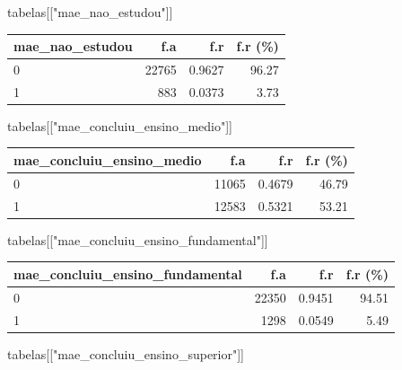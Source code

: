 \documentclass[
]{article}
\newenvironment{Shaded}{\begin{snugshade}}{\end{snugshade}}
\newcommand{\NormalTok}[1]{\textcolor[rgb]{0.00,0.23,0.31}{#1}}
\newcommand{\StringTok}[1]{\textcolor[rgb]{0.13,0.47,0.30}{#1}}
\begin{document}
\begin{Shaded}
\begin{Highlighting}[]
\NormalTok{tabelas[[}\StringTok{"mae\_nao\_estudou"}\NormalTok{]]}
\end{Highlighting}
\end{Shaded}

\begin{longtable}[]{@{}lrrr@{}}
\toprule()
mae\_nao\_estudou & f.a & f.r & f.r (\%) \\
\midrule()
\endhead
0 & 22765 & 0.9627 & 96.27 \\
1 & 883 & 0.0373 & 3.73 \\
\bottomrule()
\end{longtable}

\begin{Shaded}
\begin{Highlighting}[]
\NormalTok{tabelas[[}\StringTok{"mae\_concluiu\_ensino\_medio"}\NormalTok{]]}
\end{Highlighting}
\end{Shaded}

\begin{longtable}[]{@{}lrrr@{}}
\toprule()
mae\_concluiu\_ensino\_medio & f.a & f.r & f.r (\%) \\
\midrule()
\endhead
0 & 11065 & 0.4679 & 46.79 \\
1 & 12583 & 0.5321 & 53.21 \\
\bottomrule()
\end{longtable}

\begin{Shaded}
\begin{Highlighting}[]
\NormalTok{tabelas[[}\StringTok{"mae\_concluiu\_ensino\_fundamental"}\NormalTok{]]}
\end{Highlighting}
\end{Shaded}

\begin{longtable}[]{@{}lrrr@{}}
\toprule()
mae\_concluiu\_ensino\_fundamental & f.a & f.r & f.r (\%) \\
\midrule()
\endhead
0 & 22350 & 0.9451 & 94.51 \\
1 & 1298 & 0.0549 & 5.49 \\
\bottomrule()
\end{longtable}

\begin{Shaded}
\begin{Highlighting}[]
\NormalTok{tabelas[[}\StringTok{"mae\_concluiu\_ensino\_superior"}\NormalTok{]]}
\end{Highlighting}
\end{Shaded}
\end{document}
